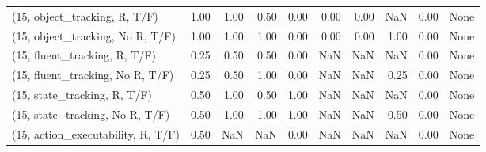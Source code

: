 \begin{table*}[h!]
\begin{adjustbox}{width=2\columnwidth,center}
\begin{tabular}{lrrr|rrr|rrr}
\midrule
(15, object\_tracking, R, T/F)         &                      1.00 &                  1.00 &                      0.50 &                          0.00 &                      0.00 &                          0.00 &                                    NaN &                               0.00 &                                  None \\
(15, object\_tracking, No R, T/F)      &                      1.00 &                  1.00 &                      1.00 &                          0.00 &                      0.00 &                          0.00 &                                   1.00 &                               0.00 &                                  None \\
(15, fluent\_tracking, R, T/F)         &                      0.25 &                  0.50 &                      0.50 &                          0.00 &                       NaN &                           NaN &                                    NaN &                               0.00 &                                  None \\
(15, fluent\_tracking, No R, T/F)      &                      0.25 &                  0.50 &                      1.00 &                          0.00 &                       NaN &                           NaN &                                   0.25 &                               0.00 &                                  None \\
(15, state\_tracking, R, T/F)          &                      0.50 &                  1.00 &                      0.50 &                          1.00 &                       NaN &                           NaN &                                    NaN &                               0.00 &                                  None \\
(15, state\_tracking, No R, T/F)       &                      0.50 &                  1.00 &                      1.00 &                          1.00 &                       NaN &                           NaN &                                   0.50 &                               0.00 &                                  None \\
(15, action\_executability, R, T/F)    &                      0.50 &                   NaN &                       NaN &                          0.00 &                       NaN &                           NaN &                                    NaN &                               0.00 &                                  None \\

\end{tabular}
\end{adjustbox}
\end{table*}
